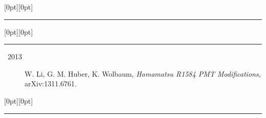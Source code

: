 \documentclass[letterpaper,12pt]{letter}
\begin{document}
\vspace{3mm}



\raisebox{0pt}[0pt][0pt]{\Large\textbf{\raisebox{-3.5ex}{Publications}}}
\\[2mm]
\rule[-0.5cm]{10cm}{1pt}

\vspace{-3mm}
\raisebox{0pt}[0pt][0pt]{\large\textbf{\raisebox{-3.5ex}{Non Refereed Journal}}}
\\[2mm]
\rule[-0.3cm]{4cm}{1pt}

\begin{description}
\item[~2013] \textrm{\normalsize W. Li, G. M. Huber, K. Wolbaum, \emph{Hamamatsu R1584 PMT Modifications}, arXiv:1311.6761.}
\end{description}




\vspace{-8mm}
\raisebox{0pt}[0pt][0pt]{\large\textbf{\raisebox{-3.5ex}{Technical Report}}}
\\[2mm]
\rule[-0.3cm]{4cm}{1pt}
\end{document}
